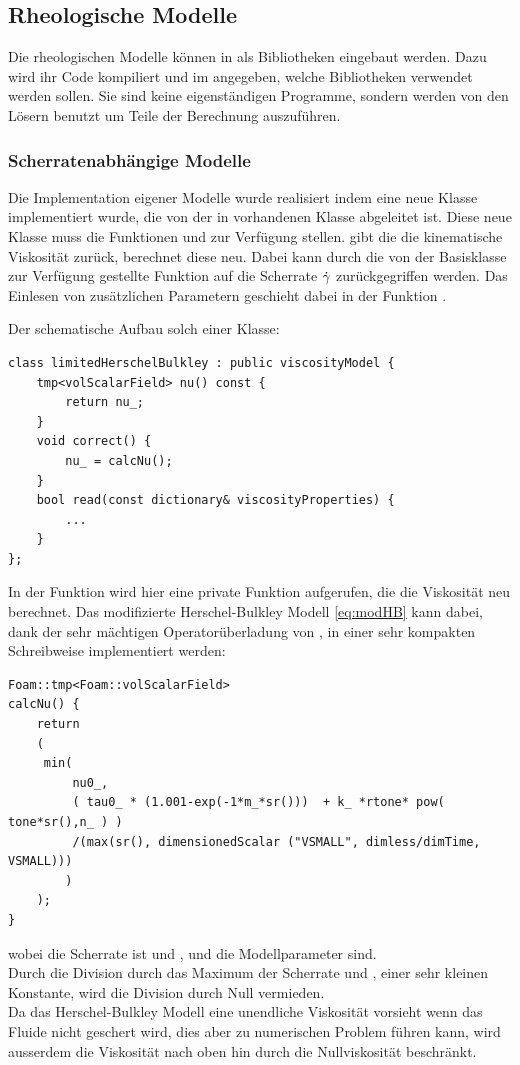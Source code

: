 \subsection{Rheologische Modelle}
Die rheologischen Modelle können in \openfoam{} als Bibliotheken eingebaut werden. Dazu wird ihr Code kompiliert und im  angegeben, welche Bibliotheken verwendet werden sollen. Sie sind keine eigenständigen Programme, sondern werden von den Lösern benutzt um Teile der Berechnung auszuführen.
%
\subsubsection{Scherratenabhängige Modelle}
Die Implementation eigener Modelle wurde realisiert indem eine neue \cpp{} Klasse implementiert wurde, die von der in \openfoam{} vorhandenen Klasse  abgeleitet ist.
Diese neue Klasse muss die Funktionen  und  zur Verfügung stellen.  gibt die die kinematische Viskosität zurück,  berechnet diese neu.
Dabei kann durch die von der Basisklasse zur Verfügung gestellte Funktion  auf die Scherrate $\dot\gamma$ zurückgegriffen werden. Das Einlesen von zusätzlichen Parametern geschieht dabei in der Funktion .

Der schematische Aufbau solch einer Klasse:
%
\begin{lstlisting}
class limitedHerschelBulkley : public viscosityModel {
    tmp<volScalarField> nu() const {
        return nu_;
    }
    void correct() {
        nu_ = calcNu();
    }
    bool read(const dictionary& viscosityProperties) {
        ...
    }
};
\end{lstlisting}
%
In der Funktion  wird hier eine private Funktion  aufgerufen, die die Viskosität neu berechnet.
Das modifizierte Herschel-Bulkley Modell \eqref{eq:modHB} kann dabei, dank der sehr mächtigen Operatorüberladung von \openfoam{}, in einer sehr kompakten Schreibweise implementiert werden:
%
\begin{lstlisting}
Foam::tmp<Foam::volScalarField>
calcNu() {    
    return
    (
     min(
         nu0_,
         ( tau0_ * (1.001-exp(-1*m_*sr()))  + k_ *rtone* pow( tone*sr(),n_ ) )
         /(max(sr(), dimensionedScalar ("VSMALL", dimless/dimTime, VSMALL)))
        )
    );
}
\end{lstlisting}
%
wobei  die Scherrate ist und ,  und  die Modellparameter sind.\\
Durch die Division durch das Maximum der Scherrate und , einer sehr kleinen Konstante, wird die Division durch Null vermieden.\\
Da das Herschel-Bulkley Modell eine unendliche Viskosität vorsieht wenn das Fluide nicht geschert wird, dies aber zu numerischen Problem führen kann, wird ausserdem die Viskosität nach oben hin durch die Nullviskosität  beschränkt.
%
